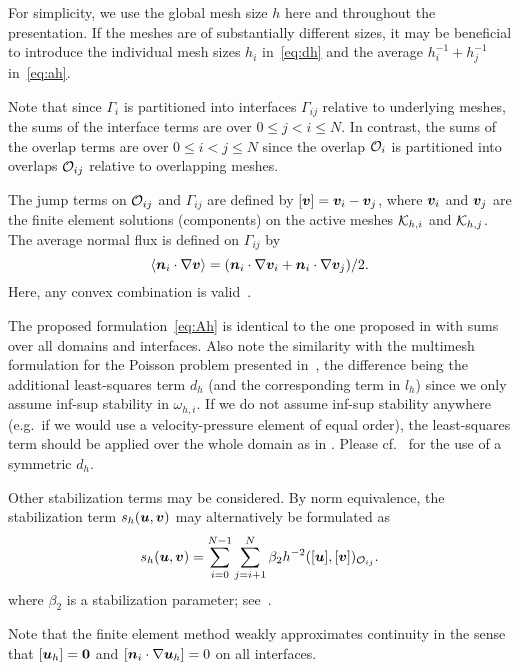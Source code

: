 \documentclass[graybox]{svmult}
\begin{document}
For simplicity, we use the global mesh size $h$ here and throughout the presentation. If the meshes are of substantially different sizes, it may be beneficial to introduce the individual mesh sizes $h_i$ in~\eqref{eq:dh} and the average $h_i^{-1} + h_j^{-1}$ in~\eqref{eq:ah}.

Note that since $\Gamma_i$ is partitioned into interfaces $\Gamma_{ij}$ relative to underlying meshes, the sums of the interface terms are over  $0 \leq j < i \leq N$. In contrast, the sums of the overlap terms are over $0 \leq i < j \leq N$ since the overlap $\mathcal{O}_i$ is partitioned into overlaps $\mathcal{O}_{ij}$ relative to overlapping meshes.

The jump terms on $\mathcal{O}_{ij}$ and $\Gamma_{ij}$ are defined by $[\bm{v}] = \bm{v}_i - \bm{v}_j$, where $\bm{v}_i$ and $\bm{v}_j$ are the finite element solutions (components) on the active meshes $\mathcal{K}_{h,i}$ and $\mathcal{K}_{h,j}$. The average normal flux is defined on $\Gamma_{ij}$ by
\begin{equation}\label{eq:average}
  \langle \bm{n}_i\cdot \nabla \bm{v} \rangle = (\bm{n}_i \cdot \nabla \bm{v}_{i} + \bm{n}_{i} \cdot \nabla \bm{v}_{j})/2.
\end{equation}
Here, any convex combination is valid~\cite{Hansbo:2003aa}.

The proposed formulation~\eqref{eq:Ah} is identical to the one proposed in \cite{Johansson:2015aa} with sums over all domains and interfaces. Also note the similarity with the multimesh formulation for the Poisson problem presented in~\cite{mmfem-1}, the difference being the additional least-squares term $d_h$ (and the corresponding term in $l_h$) since we only assume inf-sup stability in $\omega_{h,i}$. If we do not assume inf-sup stability anywhere (e.g.\ if we would use a velocity-pressure element of equal order), the least-squares term should be applied over the whole domain as in \cite{Massing:2014aa}. Please cf.\ \cite{Massing:2014aa} for the use of a symmetric $d_h$.

Other stabilization terms may be considered. By norm equivalence, the stabilization term $s_h(\bm{u}, \bm{v})$ may alternatively be formulated as
\begin{equation}\label{eq:sh-L2}
  s_h (\bm{u},\bm{v}) = \sum_{i=0}^{N-1} \sum_{j=i+1}^N \beta_2 h^{-2} ([ \bm{u} ], [\bm{v} ])_{\mathcal{O}_{ij}}.
\end{equation}
where $\beta_2$ is a stabilization parameter; see~\cite{mmfem-2}.

Note that the finite element method weakly approximates continuity in the sense that $[\bm{u}_h] = \bm{0}$ and $[\bm{n}_i \cdot \nabla \bm{u}_h] = 0$ on all interfaces.
\end{document}
